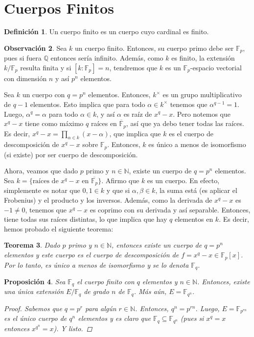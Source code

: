 \documentclass[12pt]{book}
\newtheorem{teo}{Teorema}[section]
\newtheorem{prop}[teo]{Proposición}
\theoremstyle{definition}
\newtheorem{obs}[teo]{Observación}
\newtheorem{defn}[teo]{Definición}
\newcommand{\NN}{\mathbb{N}}
\newcommand{\QQ}{\mathbb{Q}}
\newcommand{\FF}{\mathbb{F}}
\begin{document}
\section{Cuerpos Finitos}

\begin{defn}
Un cuerpo finito es un cuerpo cuyo cardinal es finito.
\end{defn}

\begin{obs}
Sea $k$ un cuerpo finito. Entonces, su cuerpo primo debe ser $\mathbb{F}_p$, pues si fuera $\QQ$ entonces sería infinito. Además, como $k$ es finito, la extensión $k/\FF_p$ resulta finita y si $[k:\FF_p]=n$, tendremos que $k$ es un $\FF_p$-espacio vectorial con dimensión $n$ y así $p^n$ elementos.

Sea $k$ un cuerpo con $q=p^n$ elementos. Entonces, $k^\times$ es un grupo multiplicativo de $q-1$ elementos. Esto implica que para todo $\alpha\in k^\times$ tenemos que $\alpha^{q-1}=1$. Luego, $\alpha^q = \alpha$ para todo $\alpha\in k$, y así $\alpha$ es raíz de $x^q -x$. Pero notemos que $x^q - x$ tiene como máximo $q$ raíces en $\overline{\FF}_p$, así que ya debo tener todas las raíces. Es decir, $x^q - x = \displaystyle\prod_{\alpha\in k}(x - \alpha)$, que implica que $k$ es el cuerpo de descomposición de $x^q - x$ sobre $\FF_p$. Entonces, $k$ es único a menos de isomorfismo (si existe) por ser cuerpo de descomposición.

Ahora, veamos que dado $p$ primo y $n\in\NN$, existe un cuerpo de $q=p^n$ elementos. Sea $k=\{\text{raíces de }x^q - x \text{ en }\overline{\FF_p}\}$. Afirmo que $k$ es un cuerpo. En efecto, simplemente es notar que $0,1\in k$ y que si $\alpha,\beta\in k$, la suma está (es aplicar el Frobenius) y el producto y los inversos. Además, como la derivada de $x^q - x$ es $-1\neq 0$, tenemos que $x^q - x$ es coprimo con su derivada y así separable. Entonces, tiene todas sus raíces distintas, lo que implica que hay $q$ elementos en $k$. Es decir, hemos probado el siguiente teorema:
\end{obs}

\begin{teo}
Dado $p$ primo y $n\in\NN$, entonces existe un cuerpo de $q=p^n$ elementos y este cuerpo es el cuerpo de descomposición de $f=x^q - x\in\FF_p[x]$. Por lo tanto, es único a menos de isomorfismo y se lo denota $\FF_q$.
\end{teo}

\begin{prop}
Sea $\FF_q$ el cuerpo finito con $q$ elementos y $n\in\NN$. Entonces, existe una única extensión $E/\FF_q$ de grado $n$ de $\FF_q$. Más aún, $E=\FF_{q^n}$.
\begin{proof}
Sabemos que $q=p^r$ para algún $r\in\NN$. Entonces, $q^n = p^{rn}$. Luego, $E=\FF_{p^{rn}}$ es el único cuerpo de $q^n$ elementos y es claro que $\FF_q\subseteq \FF_{q^n}$ (pues si $x^q = x$ entonces $x^{q^n} = x$). Y listo.
\end{proof}
\end{prop}
\end{document}
